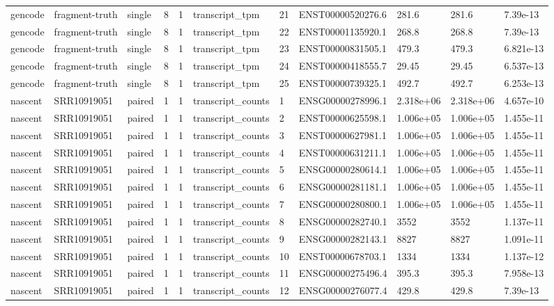 \begin{tabular}{lllllllllll}
gencode & fragment-truth & single & 8 & 1 & transcript\_tpm & 21 & ENST00000520276.6 & 281.6 & 281.6 & 7.39e-13 \\
gencode & fragment-truth & single & 8 & 1 & transcript\_tpm & 22 & ENST00001135920.1 & 268.8 & 268.8 & 7.39e-13 \\
gencode & fragment-truth & single & 8 & 1 & transcript\_tpm & 23 & ENST00000831505.1 & 479.3 & 479.3 & 6.821e-13 \\
gencode & fragment-truth & single & 8 & 1 & transcript\_tpm & 24 & ENST00000418555.7 & 29.45 & 29.45 & 6.537e-13 \\
gencode & fragment-truth & single & 8 & 1 & transcript\_tpm & 25 & ENST00000739325.1 & 492.7 & 492.7 & 6.253e-13 \\
nascent & SRR10919051 & paired & 1 & 1 & transcript\_counts & 1 & ENSG00000278996.1 & 2.318e+06 & 2.318e+06 & 4.657e-10 \\
nascent & SRR10919051 & paired & 1 & 1 & transcript\_counts & 2 & ENST00000625598.1 & 1.006e+05 & 1.006e+05 & 1.455e-11 \\
nascent & SRR10919051 & paired & 1 & 1 & transcript\_counts & 3 & ENST00000627981.1 & 1.006e+05 & 1.006e+05 & 1.455e-11 \\
nascent & SRR10919051 & paired & 1 & 1 & transcript\_counts & 4 & ENST00000631211.1 & 1.006e+05 & 1.006e+05 & 1.455e-11 \\
nascent & SRR10919051 & paired & 1 & 1 & transcript\_counts & 5 & ENSG00000280614.1 & 1.006e+05 & 1.006e+05 & 1.455e-11 \\
nascent & SRR10919051 & paired & 1 & 1 & transcript\_counts & 6 & ENSG00000281181.1 & 1.006e+05 & 1.006e+05 & 1.455e-11 \\
nascent & SRR10919051 & paired & 1 & 1 & transcript\_counts & 7 & ENSG00000280800.1 & 1.006e+05 & 1.006e+05 & 1.455e-11 \\
nascent & SRR10919051 & paired & 1 & 1 & transcript\_counts & 8 & ENSG00000282740.1 & 3552 & 3552 & 1.137e-11 \\
nascent & SRR10919051 & paired & 1 & 1 & transcript\_counts & 9 & ENSG00000282143.1 & 8827 & 8827 & 1.091e-11 \\
nascent & SRR10919051 & paired & 1 & 1 & transcript\_counts & 10 & ENST00000678703.1 & 1334 & 1334 & 1.137e-12 \\
nascent & SRR10919051 & paired & 1 & 1 & transcript\_counts & 11 & ENSG00000275496.4 & 395.3 & 395.3 & 7.958e-13 \\
nascent & SRR10919051 & paired & 1 & 1 & transcript\_counts & 12 & ENSG00000276077.4 & 429.8 & 429.8 & 7.39e-13 \\

\end{tabular}
